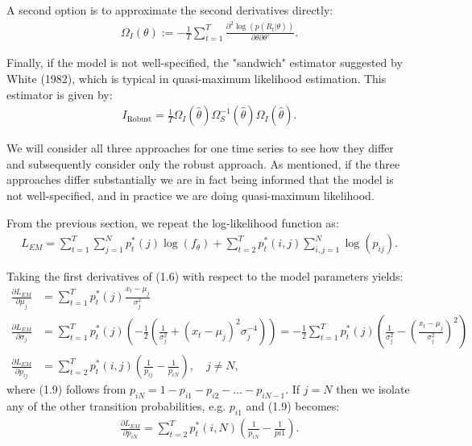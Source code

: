 \documentclass[11pt,a4paper,oneside]{article}
\newcommand{\lp}{\left(}
\newcommand{\rp}{\right)}
\newcommand{\sumt}{\sum_{t=1}^T}
\begin{document}
A second option is to approximate the second derivatives directly:
\begin{align}
    \Omega_I\lp \theta\rp := -\frac{1}{T}\sumt\frac{\partial^2 \log \lp p\lp R_t\vert \theta\rp\rp}{\partial \theta\partial \theta'}.
\end{align}

Finally, if the model is not well-specified, the "sandwich" estimator suggested by White (1982), which is typical in quasi-maximum likelihood estimation. This estimator is given by:
\begin{align}
    I_\text{Robust} = \frac{1}{T} \Omega_I\lp \hat \theta\rp \Omega_S^{-1}\lp \hat\theta\rp \Omega_I\lp \hat\theta\rp.
\end{align}

We will consider all three approaches for one time series to see how they differ and subsequently consider only the robust approach. As mentioned, if the three approaches differ substantially we are in fact being informed that the model is not well-specified, and in practice we are doing quasi-maximum likelihood.

From the previous section, we repeat the log-likelihood function as:
\begin{align}
    L_{EM} = \sumt \sum_{j = 1}^N p_t^*\lp j\rp \log\lp f_\theta\rp + \sum_{t=2}^T p_t^*\lp i, j\rp \sum_{i,j=1}^N \log\lp p_{ij}\rp.
\end{align}

Taking the first derivatives of (1.6) with respect to the model parameters yields:
\begin{align}
    \frac{\partial L_{EM}}{\partial \mu_j} &= \sumt p_t^*\lp j\rp \frac{x_t - \mu_j}{\sigma_j^2} \\
    \frac{\partial L_{EM}}{\partial \sigma_j} &= \sumt p_t^*\lp j\rp \lp - \frac{1}{2}\lp \frac{1}{\sigma_j^2} + \lp x_t - \mu_j\rp^2 \sigma_j^{-4}\rp\rp = -\frac{1}{2}\sumt p_t^*\lp j\rp \lp \frac{1}{\sigma_j^2} - \lp \frac{x_t - \mu_j}{\sigma_j^2}\rp^2\rp \\
    \frac{\partial L_{EM}}{\partial p_{ij}} &= \sum_{t=2}^T p_t^*\lp i, j\rp \lp \frac{1}{p_{ij}} - \frac{1}{p_{iN}}\rp, \quad j \neq N,
\end{align}
where (1.9) follows from $p_{iN} = 1 - p_{i1} - p_{i2} - \dots - p_{iN-1}$. If $j = N$ then we isolate any of the other transition probabilities, e.g. $p_{i1}$ and (1.9) becomes:
\begin{align}
    \frac{\partial L_{EM}}{\partial p_{iN}} = \sum_{t=2}^T p_t^*\lp i, N\rp \lp\frac{1}{p_{iN}}-\frac{1}{pi1}\rp.
\end{align}
\end{document}
